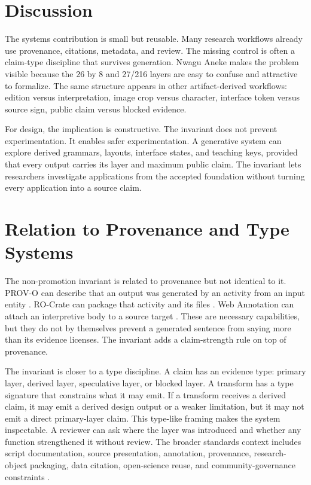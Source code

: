 \documentclass[sigconf,nonacm]{acmart}
\begin{document}
\section{Discussion}
The systems contribution is small but reusable. Many research workflows already
use provenance, citations, metadata, and review. The missing control is often a
claim-type discipline that survives generation. Nwagu Aneke makes the problem
visible because the 26 by 8 and 27/216 layers are easy to confuse and attractive
to formalize. The same structure appears in other artifact-derived workflows:
edition versus interpretation, image crop versus character, interface token
versus source sign, public claim versus blocked evidence.

For design, the implication is constructive. The invariant does not prevent
experimentation. It enables safer experimentation. A generative system can
explore derived grammars, layouts, interface states, and teaching keys, provided
that every output carries its layer and maximum public claim. The invariant lets
researchers investigate applications from the accepted foundation without
turning every application into a source claim.


\section{Relation to Provenance and Type Systems}
The non-promotion invariant is related to provenance but not identical to it.
PROV-O can describe that an output was generated by an activity from an input
entity \cite{w3cProvO}. RO-Crate can package that activity and its files
\cite{rocrate12}. Web Annotation can attach an interpretive body to a
source target \cite{w3cAnnotationModel,w3cAnnotationVocab}. These are
necessary capabilities, but they do not by themselves prevent a generated
sentence from saying more than its evidence licenses. The invariant adds a
claim-strength rule on top of provenance.

The invariant is closer to a type discipline. A claim has an evidence type:
primary layer, derived layer, speculative layer, or blocked layer. A transform
has a type signature that constrains what it may emit. If a transform receives a
derived claim, it may emit a derived design output or a weaker limitation, but
it may not emit a direct primary-layer claim. This type-like framing makes the
system inspectable. A reviewer can ask where the layer was introduced and
whether any function strengthened it without review. The broader standards
context includes script documentation, source presentation, annotation,
provenance, research-object packaging, data citation, open-science reuse, and
community-governance constraints \cite{azuonye1992,omniglotNwagu,unicodeAfricanScripts2023,scriptSourceNwagu,sirisNwaguProposal,teiP5Glyphs,iiifPresentation3,w3cAnnotationModel,w3cAnnotationVocab,w3cProvO,rocrate12,cidocCrm,datacite45,wilkinson2016fair,carroll2020care,wadden2020scifact,gao2023alce,karpathyAutoresearch,acmSubmissions,arxivSubmitTex}.
\end{document}
